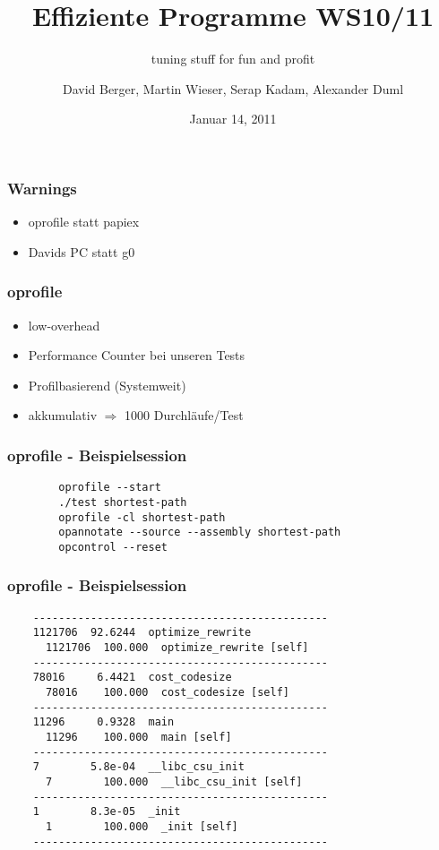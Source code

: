 \documentclass{beamer}[20pt]
\title[EP1011]{Effiziente Programme WS10/11}
\subtitle[Tuning]{tuning stuff for fun and profit}
\author[D. Berger, M. Wieser, S. Kadam, A. Duml]{David Berger, Martin Wieser, Serap Kadam, Alexander Duml}
\date[Januar 2011]{Januar 14, 2011}
\begin{document}
\begin{frame}
    \titlepage
\end{frame}

\begin{frame}
    \frametitle{Warnings}
    \begin{itemize}
        \item oprofile statt papiex
        \item Davids PC statt g0
    \end{itemize}
\end{frame}

\begin{frame}
    \frametitle{oprofile}
    \begin{itemize}
        \item low-overhead
        \item Performance Counter bei unseren Tests
        \item Profilbasierend (Systemweit)
        \item akkumulativ $\Rightarrow$ 1000 Durchläufe/Test
    \end{itemize}
\end{frame}

\begin{frame}[fragile]
    \frametitle{oprofile - Beispielsession}
        \begin{lstlisting}
        oprofile --start
        ./test shortest-path
        oprofile -cl shortest-path
        opannotate --source --assembly shortest-path
        opcontrol --reset
        \end{lstlisting}
\end{frame}

\begin{frame}[fragile]
    \frametitle{oprofile - Beispielsession}
    \begin{lstlisting}
    ----------------------------------------------
    1121706  92.6244  optimize_rewrite
      1121706  100.000  optimize_rewrite [self]
    ----------------------------------------------
    78016     6.4421  cost_codesize
      78016    100.000  cost_codesize [self]
    ----------------------------------------------
    11296     0.9328  main
      11296    100.000  main [self]
    ----------------------------------------------
    7        5.8e-04  __libc_csu_init
      7        100.000  __libc_csu_init [self]
    ----------------------------------------------
    1        8.3e-05  _init
      1        100.000  _init [self]
    ----------------------------------------------
    \end{lstlisting}
\end{frame}
\end{document}
